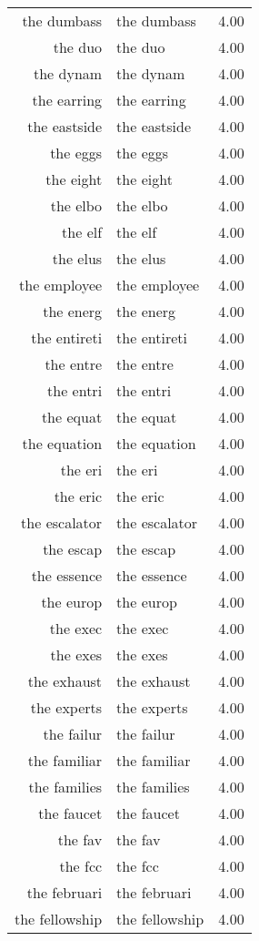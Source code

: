 \begin{table}[ht]
\begin{tabular}{rlr}
  the dumbass & the dumbass & 4.00 \\ 
  the duo & the duo & 4.00 \\ 
  the dynam & the dynam & 4.00 \\ 
  the earring & the earring & 4.00 \\ 
  the eastside & the eastside & 4.00 \\ 
  the eggs & the eggs & 4.00 \\ 
  the eight & the eight & 4.00 \\ 
  the elbo & the elbo & 4.00 \\ 
  the elf & the elf & 4.00 \\ 
  the elus & the elus & 4.00 \\ 
  the employee & the employee & 4.00 \\ 
  the energ & the energ & 4.00 \\ 
  the entireti & the entireti & 4.00 \\ 
  the entre & the entre & 4.00 \\ 
  the entri & the entri & 4.00 \\ 
  the equat & the equat & 4.00 \\ 
  the equation & the equation & 4.00 \\ 
  the eri & the eri & 4.00 \\ 
  the eric & the eric & 4.00 \\ 
  the escalator & the escalator & 4.00 \\ 
  the escap & the escap & 4.00 \\ 
  the essence & the essence & 4.00 \\ 
  the europ & the europ & 4.00 \\ 
  the exec & the exec & 4.00 \\ 
  the exes & the exes & 4.00 \\ 
  the exhaust & the exhaust & 4.00 \\ 
  the experts & the experts & 4.00 \\ 
  the failur & the failur & 4.00 \\ 
  the familiar & the familiar & 4.00 \\ 
  the families & the families & 4.00 \\ 
  the faucet & the faucet & 4.00 \\ 
  the fav & the fav & 4.00 \\ 
  the fcc & the fcc & 4.00 \\ 
  the februari & the februari & 4.00 \\ 
  the fellowship & the fellowship & 4.00 \\ 

\end{tabular}
\end{table}
